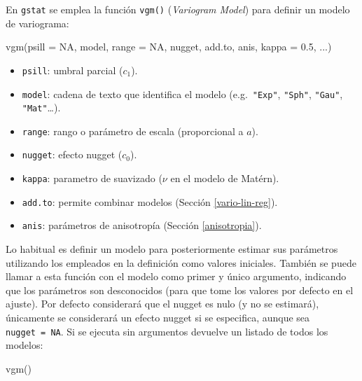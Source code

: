 \documentclass[
  spanish,
]{book}
\newenvironment{Shaded}{\begin{snugshade}}{\end{snugshade}}
\newcommand{\AttributeTok}[1]{\textcolor[rgb]{0.77,0.63,0.00}{#1}}
\newcommand{\ConstantTok}[1]{\textcolor[rgb]{0.00,0.00,0.00}{#1}}
\newcommand{\FloatTok}[1]{\textcolor[rgb]{0.00,0.00,0.81}{#1}}
\newcommand{\FunctionTok}[1]{\textcolor[rgb]{0.00,0.00,0.00}{#1}}
\newcommand{\NormalTok}[1]{#1}
\providecommand{\tightlist}{%
  \setlength{\itemsep}{0pt}\setlength{\parskip}{0pt}}
\theoremstyle{break}
\theoremstyle{definition}
\theoremstyle{definition}
\theoremstyle{definition}
\theoremstyle{definition}
\theoremstyle{remark}
\begin{document}
En \texttt{gstat} se emplea la función \texttt{vgm()} (\emph{Variogram Model}) para definir un modelo de variograma:

\begin{Shaded}
\begin{Highlighting}[]
\FunctionTok{vgm}\NormalTok{(}\AttributeTok{psill =} \ConstantTok{NA}\NormalTok{, model, }\AttributeTok{range =} \ConstantTok{NA}\NormalTok{, nugget, add.to, anis, }\AttributeTok{kappa =} \FloatTok{0.5}\NormalTok{, ...)}
\end{Highlighting}
\end{Shaded}

\begin{itemize}
\tightlist
\item
  \texttt{psill}: umbral parcial (\(c_1\)).
\item
  \texttt{model}: cadena de texto que identifica el modelo (e.g.~\texttt{"Exp"}, \texttt{"Sph"}, \texttt{"Gau"}, \texttt{"Mat"}\ldots).
\item
  \texttt{range}: rango o parámetro de escala (proporcional a \(a\)).
\item
  \texttt{nugget}: efecto nugget (\(c_0\)).
\item
  \texttt{kappa}: parametro de suavizado (\(\nu\) en el modelo de Matérn).
\item
  \texttt{add.to}: permite combinar modelos (Sección \ref{vario-lin-reg}).
\item
  \texttt{anis}: parámetros de anisotropía (Sección \ref{anisotropia}).
\end{itemize}

Lo habitual es definir un modelo para posteriormente estimar sus parámetros utilizando los empleados en la definición como valores iniciales. También se puede llamar a esta función con el modelo como primer y único argumento, indicando que los parámetros son desconocidos (para que tome los valores por defecto en el ajuste). Por defecto considerará que el nugget es nulo (y no se estimará), únicamente se considerará un efecto nugget si se especifica, aunque sea \texttt{nugget\ =\ NA}.
Si se ejecuta sin argumentos devuelve un listado de todos los modelos:

\begin{Shaded}
\begin{Highlighting}[]
\FunctionTok{vgm}\NormalTok{()}
\end{Highlighting}
\end{Shaded}
\end{document}
